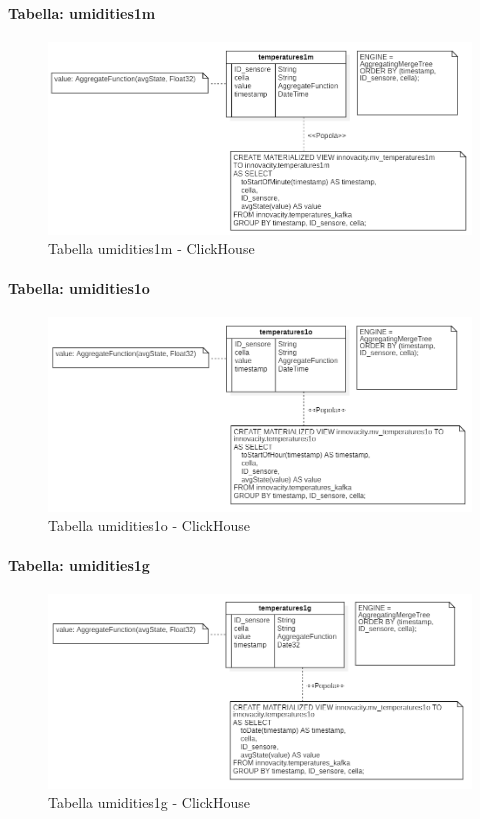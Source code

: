 \paragraph{Tabella: umidities1m}
    \begin{figure}[H]
        \centering
        \includegraphics[width=1\textwidth]{../Images/SpecificaTecnica/temperatures1m.PNG}
        \caption{Tabella  umidities1m - ClickHouse}
        \label{fig: umidities1m}
      \end{figure}
      \paragraph{Tabella:  umidities1o}
      \begin{figure}[H]
          \centering
          \includegraphics[width=1\textwidth]{../Images/SpecificaTecnica/temperatures1o.PNG}
          \caption{Tabella  umidities1o - ClickHouse}
          \label{fig: umidities1o}
        \end{figure}
    \paragraph{Tabella:  umidities1g}
    \begin{figure}[H]
        \centering
        \includegraphics[width=1\textwidth]{../Images/SpecificaTecnica/temperatures1g.PNG}
        \caption{Tabella  umidities1g - ClickHouse}
        \label{fig: umidities1g}
        \end{figure}
